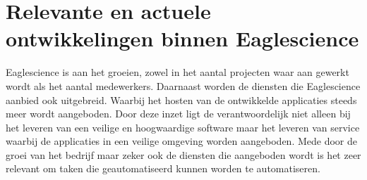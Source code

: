 \section{}

\section{Relevante en actuele ontwikkelingen binnen Eaglescience}
Eaglescience is aan het groeien, zowel in het aantal projecten waar aan gewerkt wordt als het aantal medewerkers. Daarnaast worden de diensten die Eaglescience aanbied ook uitgebreid. Waarbij het hosten van de ontwikkelde applicaties steeds meer wordt aangeboden. Door deze inzet ligt de verantwoordelijk niet alleen bij het leveren van een veilige en hoogwaardige software maar het leveren van service waarbij de applicaties in een veilige omgeving worden aangeboden. Mede door de groei van het bedrijf maar zeker ook de diensten die aangeboden wordt is het zeer relevant om taken die geautomatiseerd kunnen worden te automatiseren.

